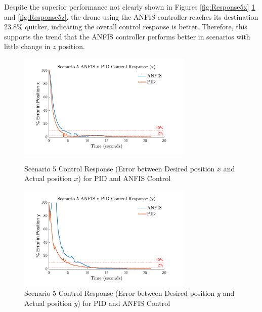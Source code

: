 Despite the superior performance not clearly shown in Figures \ref{fig:Response5x} \ref{fig:Response5y} and \ref{fig:Response5z}, the drone using the ANFIS controller reaches its destination 23.8\% quicker, indicating the overall control response is better. Therefore, this supports the trend that the ANFIS controller performs better in scenarios with little change in $z$ position. 
\begin{figure}[H]
    \centering
    \begin{minipage}[b]{0.45\textwidth}
        \centering
        \includegraphics[height=5cm,keepaspectratio]{img/Scenario 5 Error in x Position.pdf}
        \caption{Scenario 5 Control Response (Error between Desired position $x$ and Actual position $x$) for PID and ANFIS Control}
        \label{fig:Response5x}
    \end{minipage}
    \hfill
    \begin{minipage}[b]{0.45\textwidth}
        \centering
        \includegraphics[height=5cm,keepaspectratio]{img/Scenario 5 Error in y Position.pdf}
        \caption{Scenario 5 Control Response (Error between Desired position $y$ and Actual position $y$) for PID and ANFIS Control}
        \label{fig:Response5y}
    \end{minipage}
\end{figure}

